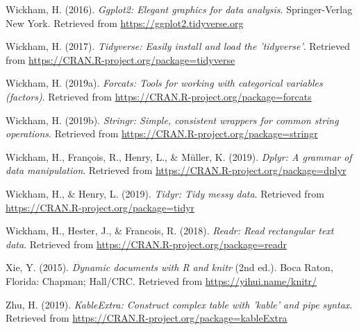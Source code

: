 \documentclass[man, fleqn, noextraspace,floatsintext]{apa6}
\begin{document}
\leavevmode\hypertarget{ref-R-ggplot2}{}%
Wickham, H. (2016). \emph{Ggplot2: Elegant graphics for data analysis}. Springer-Verlag New York. Retrieved from \url{https://ggplot2.tidyverse.org}

\leavevmode\hypertarget{ref-R-tidyverse}{}%
Wickham, H. (2017). \emph{Tidyverse: Easily install and load the 'tidyverse'}. Retrieved from \url{https://CRAN.R-project.org/package=tidyverse}

\leavevmode\hypertarget{ref-R-forcats}{}%
Wickham, H. (2019a). \emph{Forcats: Tools for working with categorical variables (factors)}. Retrieved from \url{https://CRAN.R-project.org/package=forcats}

\leavevmode\hypertarget{ref-R-stringr}{}%
Wickham, H. (2019b). \emph{Stringr: Simple, consistent wrappers for common string operations}. Retrieved from \url{https://CRAN.R-project.org/package=stringr}

\leavevmode\hypertarget{ref-R-dplyr}{}%
Wickham, H., François, R., Henry, L., \& Müller, K. (2019). \emph{Dplyr: A grammar of data manipulation}. Retrieved from \url{https://CRAN.R-project.org/package=dplyr}

\leavevmode\hypertarget{ref-R-tidyr}{}%
Wickham, H., \& Henry, L. (2019). \emph{Tidyr: Tidy messy data}. Retrieved from \url{https://CRAN.R-project.org/package=tidyr}

\leavevmode\hypertarget{ref-R-readr}{}%
Wickham, H., Hester, J., \& Francois, R. (2018). \emph{Readr: Read rectangular text data}. Retrieved from \url{https://CRAN.R-project.org/package=readr}

\leavevmode\hypertarget{ref-R-knitr}{}%
Xie, Y. (2015). \emph{Dynamic documents with R and knitr} (2nd ed.). Boca Raton, Florida: Chapman; Hall/CRC. Retrieved from \url{https://yihui.name/knitr/}

\leavevmode\hypertarget{ref-R-kableExtra}{}%
Zhu, H. (2019). \emph{KableExtra: Construct complex table with 'kable' and pipe syntax}. Retrieved from \url{https://CRAN.R-project.org/package=kableExtra}

\endgroup
\end{document}
